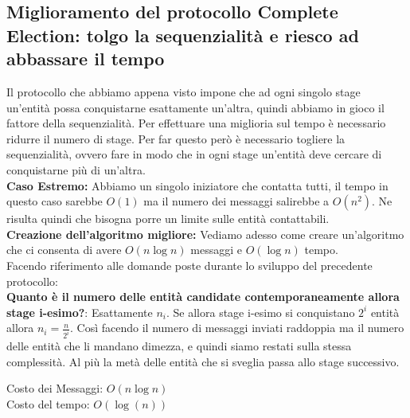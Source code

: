 \subsection{Miglioramento del protocollo Complete Election: tolgo la sequenzialità e riesco ad abbassare il tempo}
Il protocollo che abbiamo appena visto impone che ad ogni singolo stage un'entità possa conquistarne esattamente un'altra, quindi abbiamo in gioco il fattore della sequenzialità. Per effettuare una miglioria sul tempo è necessario ridurre il numero di stage. Per far questo però è necessario togliere la sequenzialità, ovvero fare in modo che in ogni stage un'entità deve cercare di conquistarne più di un'altra.\\
\textbf{Caso Estremo:} Abbiamo un singolo iniziatore che contatta tutti, il tempo in questo caso sarebbe $O(1)$ ma il numero dei messaggi salirebbe a $O(n^2)$. Ne risulta quindi che bisogna porre un limite sulle entità contattabili.\\
\textbf{Creazione dell'algoritmo migliore:} Vediamo adesso come creare un'algoritmo che ci consenta di avere $O(n \log n)$ messaggi e $O(\log n)$ tempo.\\
Facendo riferimento alle domande poste durante lo sviluppo del precedente protocollo:\\
\textbf{Quanto è il numero delle entità candidate contemporaneamente allora stage i-esimo?}: Esattamente $n_i$.
Se allora stage i-esimo si conquistano $2^i$ entità allora $n_i = \frac{n}{2^i}$. Così facendo il numero di messaggi inviati raddoppia ma il numero delle entità che li mandano dimezza, e quindi siamo restati sulla stessa complessità. Al più la metà delle entità che si sveglia passa allo stage successivo.
\begin{center}
    Costo dei Messaggi: $O(n \log n)$\\
    Costo del tempo: $O(\log(n))$
\end{center}

